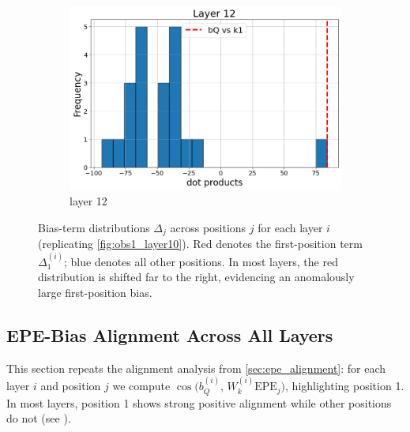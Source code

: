 \documentclass[11pt]{article}
\begin{document}
\begin{figure}[t]
\begin{subfigure}[t]{0.24\textwidth}
    \includegraphics[width=1.4\columnwidth]{figures/obs1_appendix/obs1_layer12.png}
    \caption{layer 12}
  \end{subfigure}\hfill
  \vspace{2mm}
  \caption{Bias-term distributions $\Delta_j$ across positions $j$ for each layer $i$ (replicating \cref{fig:obs1_layer10}). Red denotes the first-position term $\Delta_1^{(i)}$; blue denotes all other positions. In most layers, the red distribution is shifted far to the right, evidencing an anomalously large first-position bias.}
  \label{fig:appendix_obs1_all_layers}
\end{figure}

\subsection{EPE-Bias Alignment Across All Layers}\label{app:epe_bias}

This section repeats the alignment analysis from \cref{sec:epe_alignment}: for each layer $i$ and position $j$ we compute $\cos\big(b_Q^{(i)},\, W_k^{(i)}\mathrm{EPE}_j\big)$, highlighting position 1. In most layers, position 1 shows strong positive alignment while other positions do not (see ).
\end{document}
